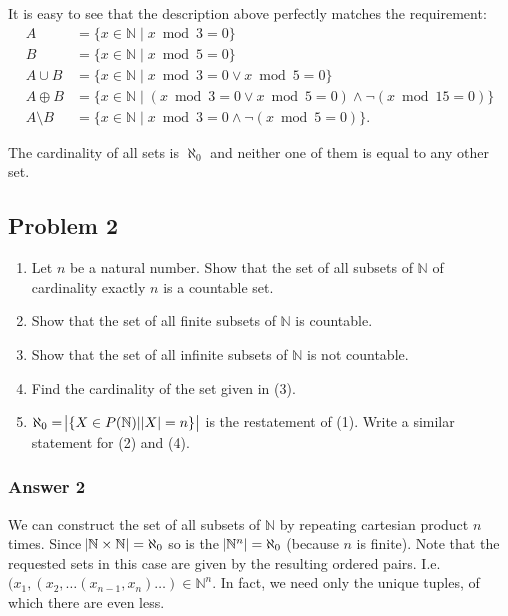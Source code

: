 \documentclass[11pt]{article}
\begin{document}
It is easy to see that the description above perfectly matches the requirement:
\begin{equation*}
  \begin{aligned}
    A             &= \{x \in \mathbb{N} \; | \; x \bmod 3 = 0\} \\
    B             &= \{x \in \mathbb{N} \; | \; x \bmod 5 = 0\} \\
    A \cup B      &= \{x \in \mathbb{N} \; | \; x \bmod 3 = 0 \lor x \bmod 5 = 0\} \\
    A \oplus B    &= \{x \in \mathbb{N} \; | \; (x \bmod 3 = 0 \lor x \bmod 5 = 0)
                      \land \lnot (x \bmod 15 = 0)\} \\
    A \setminus B &= \{x \in \mathbb{N} \; | \; x \bmod 3 = 0 \land \lnot (x \bmod 5 = 0)\}.
  \end{aligned}
\end{equation*}

The cardinality of all sets is $\aleph_0$ and neither one of them is equal to any
other set.
\subsection{Problem 2}
\label{sec-1-2}
\begin{enumerate}
\item Let $n$ be a natural number. Show that the set of all subsets of $\mathbb{N}$ of
cardinality exactly $n$ is a countable set.
\item Show that the set of all finite subsets of $\mathbb{N}$ is countable.
\item Show that the set of all infinite subsets of $\mathbb{N}$ is not countable.
\item Find the cardinality of the set given in (3).
\item $\aleph_0 = \abs{\{X \in P(\mathbb{N}) | \abs{X} = n\}}$ is the restatement of (1).
Write a similar statement for (2) and (4).
\end{enumerate}

\subsubsection{Answer 2}
\label{sec-1-2-1}
We can construct the set of all subsets of $\mathbb{N}$ by repeating cartesian
product $n$ times.  Since $\abs{\mathbb{N} \times \mathbb{N}} = \aleph_0$ so
is the $\abs{\mathbb{N}^n} = \aleph_0$ (because $n$ is finite).  Note that
the requested sets in this case are given by the resulting ordered pairs.  I.e.
$(x_1, (x_2, \hdots (x_{n-1}, x_n) \hdots) \in \mathbb{N}^n$.  In fact, we need
only the unique tuples, of which there are even less.
\end{document}
